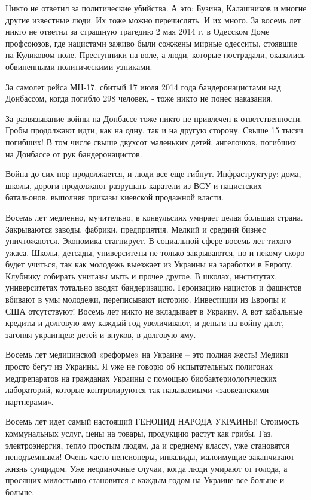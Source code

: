 Никто не ответил за политические убийства. А это: Бузина, Калашников и многие
другие известные люди. Их тоже можно перечислять. И их много. За восемь лет
никто не ответил за страшную трагедию 2 мая 2014 г. в Одесском Доме профсоюзов,
где нацистами заживо были сожжены мирные одесситы, стоявшие на Куликовом поле.
Преступники на воле, а люди, которые пострадали, оказались обвиненными
политическими узниками.

За самолет рейса МН-17, сбитый 17 июля 2014 года бандеронацистами над
Донбассом, когда погибло 298 человек, - тоже никто не понес наказания.

За развязывание войны на Донбассе тоже никто не привлечен к ответственности.
Гробы продолжают идти, как на одну, так и на другую сторону. Свыше 15 тысяч
погибших! В том числе свыше двухсот маленьких детей, ангелочков, погибших на
Донбассе от рук бандеронацистов.

Война до сих пор продолжается, и люди все еще гибнут. Инфраструктуру: дома,
школы, дороги продолжают разрушать каратели из ВСУ и нацистских батальонов,
выполняя приказы киевской продажной власти.

Восемь лет медленно, мучительно, в конвульсиях умирает целая большая страна.
Закрываются заводы, фабрики, предприятия. Мелкий и средний бизнес уничтожаются.
Экономика стагнирует. В социальной сфере восемь лет тихого ужаса. Школы,
детсады, университеты не только закрываются, но и некому скоро будет учиться,
так как молодежь выезжает из Украины на заработки в Европу. Клубнику собирать
унитазы мыть и прочее другое. В школах, институтах, университетах тотально
вводят бандеризацию. Героизацию нацистов и фашистов вбивают в умы молодежи,
переписывают историю. Инвестиции из Европы и США отсутствуют! Восемь лет никто
не вкладывает в Украину. А вот кабальные кредиты и долговую яму каждый год
увеличивают, и деньги на войну дают, загоняя украинцев: детей и внуков, в
долговую яму.

Восемь лет медицинской «реформе» на Украине – это полная жесть! Медики просто
бегут из Украины. Я уже не говорю об испытательных полигонах медпрепаратов на
гражданах Украины с помощью биобактериологических лабораторий, которые
контролируются так называемыми «заокеанскими партнерами».

Восемь лет идет самый настоящий ГЕНОЦИД НАРОДА УКРАИНЫ! Стоимость коммунальных
услуг, цены на товары, продукцию растут как грибы. Газ, электроэнергия, тепло
простым людям, да и среднему классу, уже становятся неподъемными! Очень часто
пенсионеры, инвалиды, малоимущие заканчивают жизнь суицидом. Уже неодиночные
случаи, когда люди умирают от голода, а просящих милостыню становится с каждым
годом на Украине все больше и больше.

